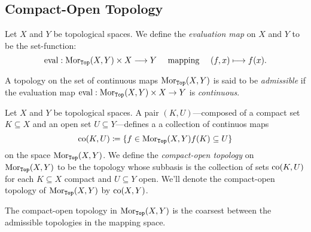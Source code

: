 \subsection{Compact-Open Topology}

\begin{definition}
\label{def:evaluation-map}
Let \(X\) and \(Y\) be topological spaces. We define the \emph{evaluation map}
on \(X\) and \(Y\) to be the set-function:
\[
\operatorname{eval}: \operatorname{Mor}_{{\texttt{Top}}}(X, Y) \times X \longrightarrow Y
\quad\text{ mapping }\quad
(f, x) \longmapsto f(x).
\]
\end{definition}

\begin{definition}
\label{def:admissible-topology}
A topology on the set of continuous maps \(\operatorname{Mor}_{{\texttt{Top}}}(X, Y)\) is said to be
\emph{admissible} if the evaluation map
\(\operatorname{eval}: \operatorname{Mor}_{{\texttt{Top}}}(X, Y) \times X \to Y\) is \emph{continuous}.
\end{definition}

\begin{definition}
\label{def:compact-open-topology}
Let \(X\) and \(Y\) be topological spaces. A pair \((K, U)\)---composed of a
compact set \(K \subseteq X\) and an open set \(U \subseteq Y\)---defines a
a collection of continuos maps
\[
\operatorname{co}(K, U) \coloneq \{f \in \operatorname{Mor}_{{\texttt{Top}}}(X, Y) \relax f(K) \subseteq U\}
\]
on the space \(\operatorname{Mor}_{{\texttt{Top}}}(X, Y)\). We define the \emph{compact-open topology}
on \(\operatorname{Mor}_{{\texttt{Top}}}(X, Y)\) to be the topology whose subbasis is the collection of
sets \(\operatorname{co}(K, U)\) for each \(K \subseteq X\) compact and \(U \subseteq Y\)
open. We'll denote the compact-open topology of \(\operatorname{Mor}_{{\texttt{Top}}}(X, Y)\) by
\(\operatorname{co}(X, Y)\).
\end{definition}

\begin{proposition}
\label{prop:compact-open-is-coarser}
The compact-open topology in \(\operatorname{Mor}_{{\texttt{Top}}}(X, Y)\) is the coarsest between the
admissible topologies in the mapping space.
\end{proposition}

